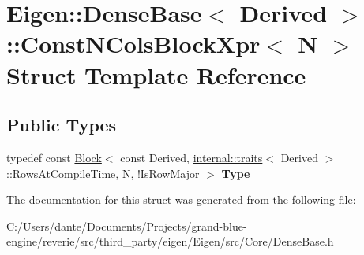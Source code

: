 \hypertarget{struct_eigen_1_1_dense_base_1_1_const_n_cols_block_xpr}{}\section{Eigen\+::Dense\+Base$<$ Derived $>$\+::Const\+N\+Cols\+Block\+Xpr$<$ N $>$ Struct Template Reference}
\label{struct_eigen_1_1_dense_base_1_1_const_n_cols_block_xpr}
\subsection*{Public Types}
\begin{DoxyCompactItemize}
\item 
\mbox{\label{struct_eigen_1_1_dense_base_1_1_const_n_cols_block_xpr_a73b934e0c38b490e5e639189d81b6266}} 
typedef const \mbox{\hyperlink{class_eigen_1_1_block}{Block}}$<$ const Derived, \mbox{\hyperlink{struct_eigen_1_1internal_1_1traits}{internal\+::traits}}$<$ Derived $>$\+::\mbox{\hyperlink{class_eigen_1_1_dense_base_a86241c772c74c04eeeb0480b99c5ab77adb37c78ebbf15aa20b65c3b70415a1ab}{Rows\+At\+Compile\+Time}}, N, !\mbox{\hyperlink{class_eigen_1_1_dense_base_a86241c772c74c04eeeb0480b99c5ab77a406b6af91d61d348ba1c9764bdd66008}{Is\+Row\+Major}} $>$ {\bfseries Type}
\end{DoxyCompactItemize}


The documentation for this struct was generated from the following file\+:\begin{DoxyCompactItemize}
\item 
C\+:/\+Users/dante/\+Documents/\+Projects/grand-\/blue-\/engine/reverie/src/third\+\_\+party/eigen/\+Eigen/src/\+Core/Dense\+Base.\+h\end{DoxyCompactItemize}
